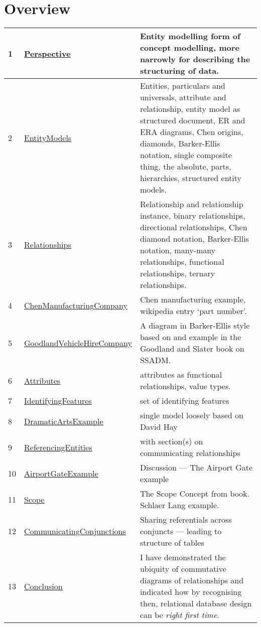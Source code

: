
\newcommand{\mysection}[1]{\underline{\hyperref[#1]{#1}}}
\section*{Overview}
\begin{tabular}{l l p{7cm}}
1 & \mysection{Perspective} & Entity modelling form of concept modelling, more narrowly for describing the structuring of data.\\
\hline
2 & \mysection{EntityModels} & Entities, particulars and universals, attribute and relationship, entity model as structured document, ER and ERA diagrams, Chen origins, diamonds, Barker-Ellis notation, single composite thing, the absolute, parts, hierarchies, structured entity models.\\
\hline
3 & \mysection{Relationships} & Relationship and relationship instance, binary relationships, directional relationships, Chen diamond notation, Barker-Ellis notation, many-many relationships, functional relationships, ternary relationships. \\
\hline
4 & \mysection{ChenManufacturingCompany} & Chen manufacturing example, wikipedia entry `part number'.\\
\hline
5 & \mysection{GoodlandVehicleHireCompany} & A diagram in Barker-Ellis style based on and example in the Goodland and Slater book on SSADM.\\
\hline
6 & \mysection{Attributes} & attributes as functional relationships, value types.
\\
\hline
7 & \mysection{IdentifyingFeatures} &  set of identifying features\\
\hline
8 & \mysection{DramaticArtsExample} &  single model loosely based on David Hay\\
\hline
9 & \mysection{ReferencingEntities} &  with section(s) on communicating relationships\\
\hline
10 & \mysection{AirportGateExample} &  Discussion --- The Airport Gate example\\
\hline
11 & \mysection{Scope} & The Scope Concept from book.   Schlaer Lang example. \\
\hline
12 & \mysection{CommunicatingConjunctions} & Sharing referentials across conjuncts --- 
                                                 leading to structure of tables\\
13 & \mysection{Conclusion} & I have demonstrated the ubiquity of commutative diagrams of relationships
and indicated how by recognising then,  relational database design can be \textit{right first time}. \\

\end{tabular}
